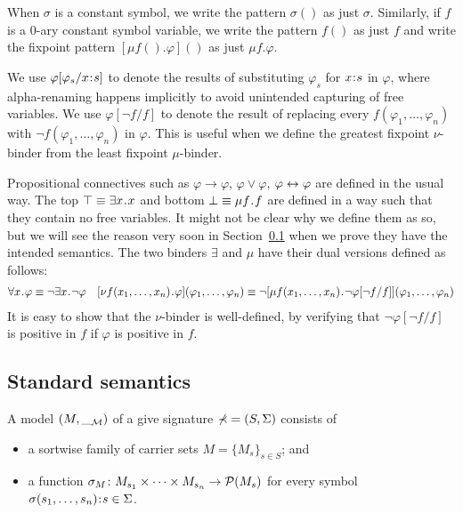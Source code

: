 \documentclass{amsart}
\begin{document}
\begin{notation}
When $\sigma$ is a constant symbol, 
we write the pattern $\sigma()$ as just $\sigma$.
Similarly, if $f$ is a $0$-ary constant symbol variable,
we write the pattern $f()$ as just $f$
and write the fixpoint pattern
$[\mu f() . \varphi]()$ as just $\mu f . \varphi$.
\end{notation}

\begin{notation}
We use $\varphi[\varphi_s / x \mathbin{\!:\!} s]$ to denote
the results of substituting $\varphi_s$ for $x \mathbin{\!:\!} s$
in $\varphi$, where alpha-renaming happens implicitly to avoid
unintended capturing of free variables. 
We use $\varphi[\neg f / f]$ to denote the result of replacing
every $f(\varphi_1,\dots,\varphi_n)$ with
$\neg f(\varphi_1,\dots,\varphi_n)$ in $\varphi$.
This is useful when we define the greatest fixpoint $\nu$-binder
from the least fixpoint $\mu$-binder. 
\end{notation}

Propositional connectives
such as $\varphi \to \varphi$, $\varphi \vee \varphi$,
$\varphi \leftrightarrow \varphi$
are defined in the usual way.
The top $\top \equiv \exists x \mathbin{\!.\!} x$ and bottom $\bot \equiv \mu f \mathbin{\!.\!} f$
are defined in a way such that they contain no free variables.  
It might not be clear why we define them as so,
but we will see the reason very soon in Section~\ref{sec:standard_semantics}
when we prove they have the intended semantics.
The two binders $\exists$ and $\mu$ have their
dual versions defined as follows:
\begin{align*}
\forall x \ldot \varphi \equiv \neg \exists x \ldot \neg \varphi
&&
[\nu f(x_1,\dots,x_n) \ldot \varphi](\varphi_1 , \dots, \varphi_n)
\equiv
\neg
[\mu f(x_1,\dots,x_n) \ldot \neg \varphi[\neg f / f]]
(\varphi_1 , \dots, \varphi_n)
\end{align*}
It is easy to show that the $\nu$-binder
is well-defined, by verifying that $\neg \varphi [\neg f / f]$ is positive in
$f$ if $\varphi$ is positive in $f$.


\subsection{Standard semantics}
\label{sec:standard_semantics}

\begin{definition}
A model $(M,\__{\mathcal{M}})$ of a give signature $\mathbb{\Sigma} = (S, \Sigma)$
consists of
\begin{itemize}
\item a sortwise family of carrier sets $M = \{M_s\}_{s \in S}$; and
\item a function 
$\sigma_M \colon M_{s_1} \times \dots \times M_{s_n} \to \mathcal{P}(M_s)$
for every symbol $\sigma(s_1,\dots,s_n) \mathbin{\!:\!} s \in \Sigma$.
\end{itemize}
\end{definition}
\end{document}
